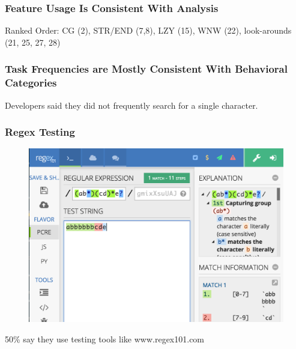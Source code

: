 \begin{frame}
\frametitle{Feature Usage Is Consistent With Analysis}

\begin{center}
Ranked Order: CG (2), STR/END (7,8), LZY (15), WNW (22), look-arounds (21, 25, 27, 28)
\end{center}
\end{frame}


\begin{frame}
\frametitle{Task Frequencies are Mostly Consistent With Behavioral Categories}

\begin{center}
Developers said they did not frequently search for a single character.
\end{center}
\end{frame}
\note[itemize]{
    \item
}


\begin{frame}
\frametitle{Regex Testing}

\begin{figure}[ht]
  \includegraphics[scale=0.35]{nontex/regex101}
  \label{fig:regex101}
\end{figure}
\begin{center}
50\% say they use testing tools like www.regex101.com
\end{center}
\end{frame}

